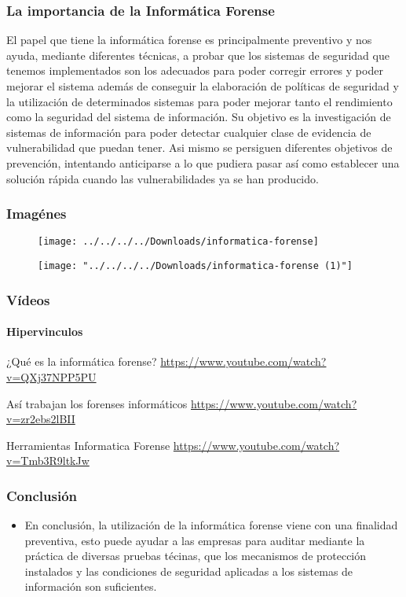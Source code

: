 \documentclass[12pt]{beamer}
\begin{document}
\begin{frame}
\frametitle{La importancia de la Informática Forense}

El papel que tiene la informática forense es principalmente preventivo y nos ayuda, mediante diferentes técnicas, a probar que los sistemas de seguridad que tenemos implementados son los adecuados para poder corregir errores y poder mejorar el sistema además de conseguir la elaboración de políticas de seguridad y la utilización de determinados sistemas para poder mejorar tanto el rendimiento como la seguridad del sistema de información.
Su objetivo es la investigación de sistemas de información para poder detectar cualquier clase de evidencia de vulnerabilidad que puedan tener. Asi mismo se persiguen diferentes objetivos de prevención, intentando anticiparse a lo que pudiera pasar así como establecer una solución rápida cuando las vulnerabilidades ya se han producido.
\end{frame}


\begin{frame}	
\frametitle{Imagénes}
\begin{figure}
	\centering
	\texttt{[image: ../../../../Downloads/informatica-forense]}
	\label{fig:informatica-forense}
\end{figure}
\end{frame}

\begin{frame}
\begin{figure}
	\centering
	\texttt{[image: "../../../../Downloads/informatica-forense (1)"]}
	\label{fig:informatica-forense-1}
\end{figure}
	\end{frame}


\begin{frame}
	\frametitle{Vídeos}
	\framesubtitle{Hipervinculos}
	
	¿Qué es la informática forense?
	\textcolor{blue}{\url{https://www.youtube.com/watch?v=QXj37NPP5PU}}
	
	Así trabajan los forenses informáticos
	\textcolor{blue}{\url{https://www.youtube.com/watch?v=zr2ebs2lBII}}
	
	Herramientas Informatica Forense
	\textcolor{blue}{\url{https://www.youtube.com/watch?v=Tmb3R9ltkJw}}
\end{frame}


\begin{frame}
	\frametitle{Conclusión}
	\begin{itemize}
		
\item En conclusión, la utilización de la informática forense viene con una finalidad preventiva, esto puede ayudar  a las empresas para auditar mediante la práctica de diversas pruebas técinas, que los mecanismos de protección instalados y las condiciones de seguridad aplicadas a los sistemas de información son suficientes.
	\end{itemize}
\end{frame}
\end{document}
